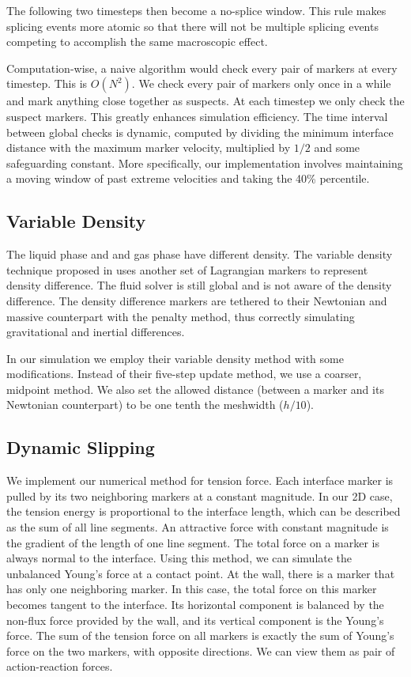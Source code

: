 \documentclass{jfm}
\begin{document}
The following two timesteps then become a no-splice window. This rule makes splicing events more atomic so that there will not be multiple splicing events competing to accomplish the same macroscopic effect. 

Computation-wise, a naive algorithm would check every pair of markers at every timestep. This is $O(N^2)$. We check every pair of markers only once in a while and mark anything close together as suspects. At each timestep we only check the suspect markers. This greatly enhances simulation efficiency. The time interval between global checks is dynamic, computed by dividing the minimum interface distance with the maximum marker velocity, multiplied by $1/2$ and some safeguarding constant. More specifically, our implementation involves maintaining a moving window of past extreme velocities and taking the 40\% percentile. 

\subsection{Variable Density}
The liquid phase and and gas phase have different density. The variable density technique proposed in \cite{IBM_variable_density} uses another set of Lagrangian markers to represent density difference. The fluid solver is still global and is not aware of the density difference. The density difference markers are tethered to their Newtonian and massive counterpart with the penalty method, thus correctly simulating gravitational and inertial differences.

In our simulation we employ their variable density method with some modifications. Instead of their five-step update method, we use a coarser, midpoint method. We also set the allowed distance (between a marker and its Newtonian counterpart) to be one tenth the meshwidth ($h/10$). 

\subsection{Dynamic Slipping}\label{sec:results}
We implement our numerical method for tension force. Each interface marker is pulled by its two neighboring markers at a constant magnitude. In our 2D case, the tension energy is proportional to the interface length, which can be described as the sum of all line segments. An attractive force with constant magnitude is the gradient of the length of one line segment. The total force on a marker is always normal to the interface. Using this method, we can simulate the unbalanced Young's force at a contact point. At the wall, there is a marker that has only one neighboring marker. In this case, the total force on this marker becomes tangent to the interface. Its horizontal component is balanced by the non-flux force provided by the wall, and its vertical component is the Young's force. The sum of the tension force on all markers is exactly the sum of Young's force on the two markers, with opposite directions. We can view them as pair of action-reaction forces.
\end{document}
